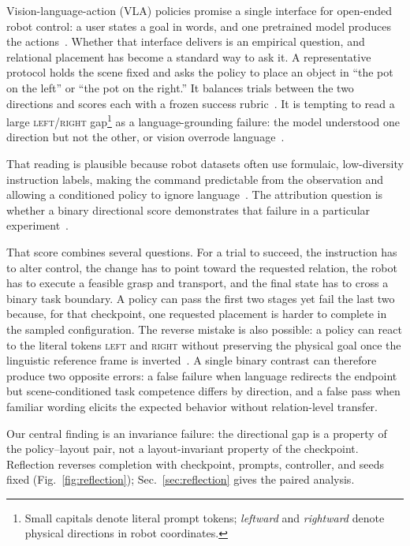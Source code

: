 \documentclass[letterpaper,10pt,conference]{ieeeconf}%
\newcommand{\tokL}{\textsc{left}}
\newcommand{\tokR}{\textsc{right}}
\begin{document}
Vision-language-action (VLA) policies promise a single interface for open-ended robot control: a user states a goal in words, and one pretrained model produces the actions~\cite{brohan2023rt2,kim2024openvla,black2024pi0,black2025pi05}.
Whether that interface delivers is an empirical question, and relational placement has become a standard way to ask it.
A representative protocol holds the scene fixed and asks the policy to place an object in ``the pot on the left'' or ``the pot on the right.''
It balances trials between the two directions and scores each with a frozen success rubric~\cite{chen2026steerable}.
It is tempting to read a large \tokL{}/\tokR{} gap\footnote{Small capitals denote literal prompt tokens; \emph{leftward} and \emph{rightward} denote physical directions in robot coordinates.} as a language-grounding failure: the model understood one direction but not the other, or vision overrode language~\cite{fang2026cag}.

That reading is plausible because robot datasets often use formulaic, low-diversity instruction labels, making the command predictable from the observation and allowing a conditioned policy to ignore language~\cite{wanna2026linguistic,bowman2016continuous,he2019lagging}.
The attribution question is whether a binary directional score demonstrates that failure in a particular experiment~\cite{chen2026resteer}.

That score combines several questions.
For a trial to succeed, the instruction has to alter control, the change has to point toward the requested relation, the robot has to execute a feasible grasp and transport, and the final state has to cross a binary task boundary.
A policy can pass the first two stages yet fail the last two because, for that checkpoint, one requested placement is harder to complete in the sampled configuration.
The reverse mistake is also possible: a policy can react to the literal tokens \tokL{} and \tokR{} without preserving the physical goal once the linguistic reference frame is inverted~\cite{li2025confined}.
A single binary contrast can therefore produce two opposite errors: a false failure when language redirects the endpoint but scene-conditioned task competence differs by direction, and a false pass when familiar wording elicits the expected behavior without relation-level transfer.

Our central finding is an invariance failure: the directional gap is a property of the policy--layout pair, not a layout-invariant property of the checkpoint.
Reflection reverses completion with checkpoint, prompts, controller, and seeds fixed (Fig.~\ref{fig:reflection}); Sec.~\ref{sec:reflection} gives the paired analysis.
\end{document}
